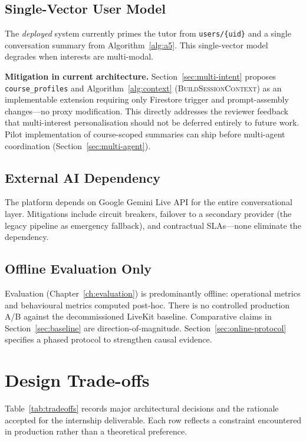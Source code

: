 \subsection{Single-Vector User Model}
\label{sec:limit-vector}

The \emph{deployed} system currently primes the tutor from \texttt{users/\{uid\}} and a single conversation summary from Algorithm~\ref{alg:a5}. This single-vector model degrades when interests are multi-modal.

\textbf{Mitigation in current architecture.} Section~\ref{sec:multi-intent} proposes \texttt{course\_profiles} and Algorithm~\ref{alg:context} (\textsc{BuildSessionContext}) as an implementable extension requiring only Firestore trigger and prompt-assembly changes---no proxy modification. This directly addresses the reviewer feedback that multi-interest personalisation should not be deferred entirely to future work. Pilot implementation of course-scoped summaries can ship before multi-agent coordination (Section~\ref{sec:multi-agent}).

\subsection{External AI Dependency}
\label{sec:limit-dependency}

The platform depends on Google Gemini Live API for the entire conversational layer. Mitigations include circuit breakers, failover to a secondary provider (the legacy pipeline as emergency fallback), and contractual SLAs---none eliminate the dependency.

\subsection{Offline Evaluation Only}
\label{sec:limit-offline}

Evaluation (Chapter~\ref{ch:evaluation}) is predominantly offline: operational metrics and behavioural metrics computed post-hoc. There is no controlled production A/B against the decommissioned LiveKit baseline. Comparative claims in Section~\ref{sec:baseline} are direction-of-magnitude. Section~\ref{sec:online-protocol} specifies a phased protocol to strengthen causal evidence.

\section{Design Trade-offs}
\label{sec:tradeoffs}

Table~\ref{tab:tradeoffs} records major architectural decisions and the rationale accepted for the internship deliverable. Each row reflects a constraint encountered in production rather than a theoretical preference.

